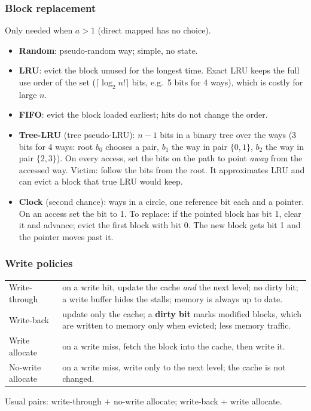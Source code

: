 \subsubsection{Block replacement}
Only needed when $a>1$ (direct mapped has no choice).
\begin{itemize}[leftmargin=*]
  \item \textbf{Random}: pseudo-random way; simple, no state.
  \item \textbf{LRU}: evict the block unused for the longest time. Exact LRU
  keeps the full use order of the set ($\lceil\log_2 n!\rceil$ bits, e.g.\ 5 bits
  for 4 ways), which is costly for large $n$.
  \item \textbf{FIFO}: evict the block loaded earliest; hits do not change the
  order.
  \item \textbf{Tree-LRU} (tree pseudo-LRU): $n-1$ bits in a binary tree over the
  ways (3 bits for 4 ways: root $b_0$ chooses a pair, $b_1$ the way in pair
  $\{0,1\}$, $b_2$ the way in pair $\{2,3\}$). On every access, set the bits on the
  path to point \emph{away} from the accessed way. Victim: follow the bits from the
  root. It approximates LRU and can evict a block that true LRU would keep.
  \item \textbf{Clock} (second chance): ways in a circle, one reference bit each and a
  pointer. On an access set the bit to 1. To replace: if the pointed block has bit 1,
  clear it and advance; evict the first block with bit 0. The new block gets bit 1
  and the pointer moves past it.
\end{itemize}

\subsubsection{Write policies}
\begin{center}
\small
\begin{tabular}{@{}p{2.6cm}p{11.6cm}@{}}
\toprule
Write-through & on a write hit, update the cache \emph{and} the next level; no dirty
bit; a write buffer hides the stalls; memory is always up to date. \\
Write-back & update only the cache; a \textbf{dirty bit} marks modified blocks, which
are written to memory only when evicted; less memory traffic. \\
\midrule
Write allocate & on a write miss, fetch the block into the cache, then write it. \\
No-write allocate & on a write miss, write only to the next level; the cache is not
changed. \\
\bottomrule
\end{tabular}
\end{center}
Usual pairs: write-through $+$ no-write allocate; write-back $+$ write allocate.

